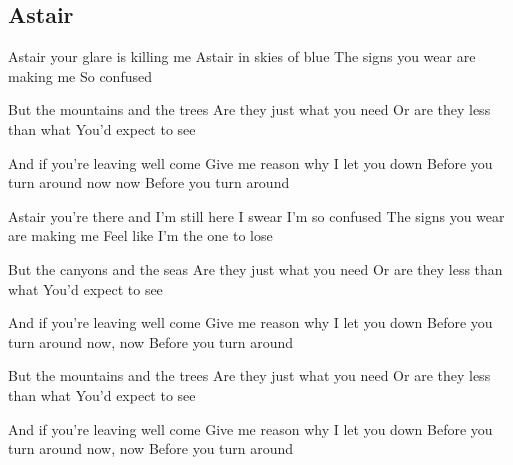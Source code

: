 \subsection*{Astair   }
\begin{guitar}
Astair your glare is killing me
Astair in skies of blue
The signs you wear are making me
So confused

				
				
But the mountains and the trees
Are they just what you need
Or are they less than what
You'd expect to see

				
				
And if you're leaving well come
Give me reason why I let you down
Before you turn around now now
Before you turn around

				
				
Astair you're there and I'm still here
I swear I'm so confused
The signs you wear are making me
Feel like I'm the one to lose

				
				
But the canyons and the seas 
Are they just what you need
Or are they less than what
You'd expect to see

				
				
And if you're leaving well come 
Give me reason why I let you down
Before you turn around now, now
Before you turn around

				
				
But the mountains and the trees
Are they just what you need
Or are they less than what
You'd expect to see

				
				
And if you're leaving well come 
Give me reason why I let you down
Before you turn around now, now
Before you turn around
\end{guitar}
